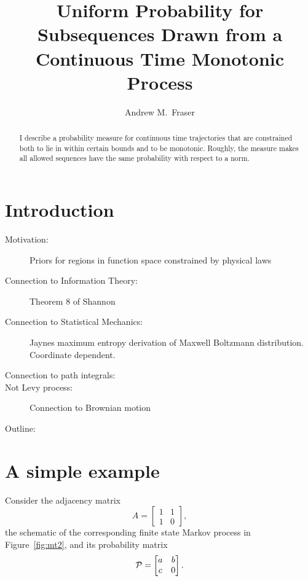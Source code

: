 \documentclass[12pt]{article} \usepackage{amsmath,amsfonts}
\title{Uniform Probability for Subsequences Drawn from a Continuous
  Time Monotonic Process }
\author{Andrew M.\ Fraser}
\newcommand{\T}{{\cal P}}
\begin{document}
\maketitle
\begin{abstract}
  I describe a probability measure for continuous time trajectories that
  are constrained both to lie in within certain bounds and to be
  monotonic.  Roughly, the measure makes all allowed sequences have
  the same probability with respect to a norm.
\end{abstract}

\section{Introduction}
\label{sec:introduction}
\begin{description}
\item[Motivation:] Priors for regions in function space constrained by
  physical laws
\item[Connection to Information Theory:] Theorem 8 of Shannon
\item[Connection to Statistical Mechanics:] Jaynes maximum entropy
  derivation of Maxwell Boltzmann distribution.  Coordinate dependent.
\item[Connection to path integrals:]
\item[Not Levy process:] Connection to Brownian motion
\item[Outline:]
\end{description}

\section{A simple example}
\label{sec:example}

Consider the adjacency matrix
\begin{equation}
  \label{eq:A}
  A = \begin{bmatrix} 1 & 1 \\ 1 & 0 \end{bmatrix},
\end{equation}
the schematic of the corresponding finite state Markov process in
Figure~\ref{fig:mt2}, and its probability matrix
\begin{equation}
  \label{eq:T}
  \T = \begin{bmatrix} a & b \\ c & 0 \end{bmatrix}.
\end{equation}
\end{document}
